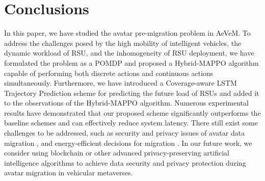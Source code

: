\documentclass[lettersize,journal]{IEEEtran}
\begin{document}



\section{Conclusions}\label{conclude}
In this paper, we have studied the avatar pre-migration problem in AeVeM. To address the challenges posed by the high mobility of intelligent vehicles, the dynamic workload of RSU, and the inhomogeneity of RSU deployment, we have formulated the problem as a POMDP and proposed a Hybrid-MAPPO algorithm capable of performing both discrete actions and continuous actions simultaneously. Furthermore, we have introduced a Coverage-aware LSTM Trajectory Prediction scheme for predicting the future load of RSUs and added it to the observations of the Hybrid-MAPPO algorithm. Numerous experimental results have demonstrated that our proposed scheme significantly outperforms the baseline schemes and can effectively reduce system latency.  There still exist some challenges to be addressed, such as security and privacy issues of avatar data migration \cite{wu2022delay}, and energy-efficient decisions for migration \cite{yang2021local}. In our future work, we consider using blockchain or other advanced privacy-preserving artificial intelligence algorithms to achieve data security and privacy protection during avatar migration in vehicular metaverses.










\newpage






\vfill
\end{document}
